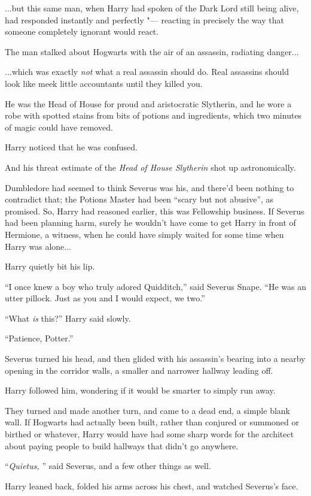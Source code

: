 ...but this same man, when Harry had spoken of the Dark Lord still
being alive, had responded instantly and perfectly "--- reacting in
precisely the way that someone completely ignorant would react.

The man stalked about Hogwarts with the air of an assassin, radiating
danger...

...which was exactly \emph{not} what a real assassin should do.
Real assassins should look like meek little accountants until they
killed you.

He was the Head of House for proud and aristocratic Slytherin, and he
wore a robe with spotted stains from bits of potions and ingredients,
which two minutes of magic could have removed.

Harry noticed that he was confused.

And his threat estimate of the \emph{Head of House Slytherin} shot up
astronomically.

Dumbledore had seemed to think Severus was his, and there'd been nothing
to contradict that; the Potions Master had been ``scary but not
abusive'', as promised. So, Harry had reasoned earlier, this was
Fellowship business. If Severus had been planning harm, surely he
wouldn't have come to get Harry in front of Hermione, a witness, when he
could have simply waited for some time when Harry was alone...

Harry quietly bit his lip.

``I once knew a boy who truly adored Quidditch,'' said Severus Snape.
``He was an utter pillock. Just as you and I would expect, we two.''

``What \emph{is} this?'' Harry said slowly.

``Patience, Potter.''

Severus turned his head, and then glided with his assassin's bearing
into a nearby opening in the corridor walls, a smaller and narrower
hallway leading off.

Harry followed him, wondering if it would be smarter to simply run away.

They turned and made another turn, and came to a dead end, a simple
blank wall. If Hogwarts had actually been built, rather than conjured or
summoned or birthed or whatever, Harry would have had some sharp words
for the architect about paying people to build hallways that didn't go
anywhere.

``\emph{Quietus,} '' said Severus, and a few other things as well.

Harry leaned back, folded his arms across his chest, and watched
Severus's face.

